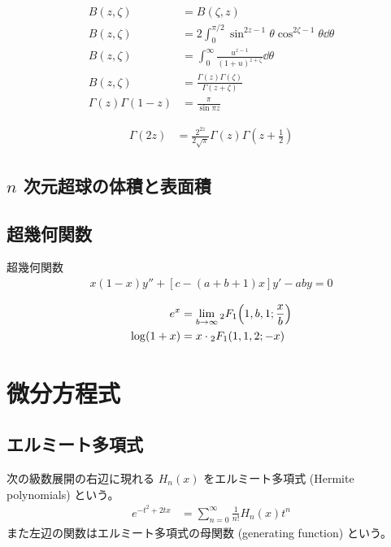 \documentclass[uplatex,dvipdfmx,a4paper,11pt]{jlreq}
\theoremstyle{definition}
\begin{document}
\begin{proposition}
  \begin{align}
    B(z, \zeta)            & = B(\zeta, z)                                                          \\
    B(z, \zeta)            & = 2\int_0^{\pi/2}\sin^{2z - 1}\theta\cos^{2\zeta - 1}\theta\dd{\theta} \\
    B(z, \zeta)            & = \int_0^{\infty}\frac{u^{z-1}}{(1 + u)^{z + \zeta}}\dd{\theta}        \\
    B(z, \zeta)            & = \frac{\Gamma(z)\Gamma(\zeta)}{\Gamma(z + \zeta)}                     \\
    \Gamma(z)\Gamma(1 - z) & = \frac{\pi}{\sin\pi z}
  \end{align}
\end{proposition}

\begin{proposition}
  \begin{align}
    \Gamma(2z) & = \frac{2^{2z}}{2\sqrt{\pi}}\Gamma(z)\Gamma(z + \frac{1}{2})
  \end{align}
\end{proposition}


\subsection{$n$ 次元超球の体積と表面積}

\subsection{超幾何関数}
\begin{definition}
  超幾何関数
  \begin{align}
    x(1 - x)y'' + [c - (a + b + 1)x]y' - aby = 0
  \end{align}
\end{definition}
\begin{proposition}
  \begin{align}
    e^x         & = \lim_{b\to\infty}{}_2F_1\qty(1,b,1;\frac{x}{b}) \\
    \log(1 + x) & = x\cdot{}_2F_1(1,1,2;-x)
  \end{align}
\end{proposition}
\section{微分方程式}
\subsection{エルミート多項式}
\begin{definition}[エルミート多項式]
  次の級数展開の右辺に現れる $H_n(x)$ をエルミート多項式 (Hermite polynomials) という。
  \begin{align}
    e^{-t^2 + 2tx} & = \sum_{n=0}^{\infty}\frac{1}{n!}H_n(x)t^n
  \end{align}
  また左辺の関数はエルミート多項式の母関数 (generating function) という。
\end{definition}
\end{document}

